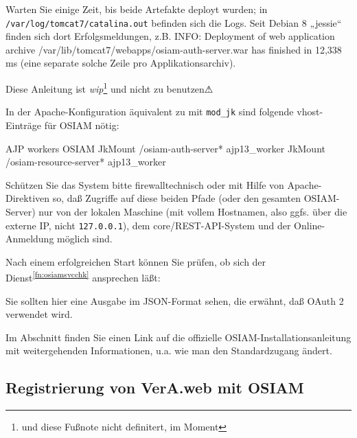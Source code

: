 Warten Sie einige Zeit, bis beide Artefakte deployt wurden; in
\texttt{/var/log/tomcat7/catalina.out} befinden sich die Logs.
Seit Debian 8 „jessie“ finden sich dort Erfolgsmeldungen, z.B.
{\ttfamily INFO: Deployment of web application archive
/var/lib/tomcat7/webapps/osiam-auth-server.war has finished
in 12,338 ms} (eine separate solche Zeile pro Applikationsarchiv).

Diese Anleitung ist \emph{wip}\Hair\footnote{\label{fn:jessie}und
diese Fußnote nicht definitert, im Moment} und nicht zu benutzen⚠

\begin{minipage}{\textwidth}
In der Apache-Konfiguration äquivalent zu 
mit \texttt{mod\_jk} sind folgende vhost-Einträge für OSIAM nötig:

\begin{lstdump}{AJP workers OSIAM}
JkMount /osiam-auth-server* ajp13_worker
JkMount /osiam-resource-server* ajp13_worker
\end{lstdump}
\end{minipage}

Schützen Sie das System bitte firewalltechnisch oder mit Hilfe von
Apache-Direktiven so, daß Zugriffe auf diese beiden Pfade (oder den
gesamten OSIAM-Server) nur von der lokalen Maschine (mit vollem
Hostnamen, also ggfs. über die externe IP, nicht \texttt{127.0.0.1}),
dem core/REST-API-System und der Online-Anmeldung möglich sind.

\begin{minipage}{\textwidth}
Nach einem erfolgreichen Start können Sie prüfen, ob sich der
Dienst\Hair\textsuperscript{\ref{fn:osiamsvcchk}} ansprechen läßt:


Sie sollten hier eine Ausgabe im JSON-Format sehen, die erwähnt,
daß OAuth 2 verwendet wird.
\end{minipage}

Im Abschnitt  finden Sie einen Link auf die
offizielle OSIAM-Installationsanleitung mit weitergehenden
Informationen, u.a. wie man den Standardzugang ändert.

\subsection{Registrierung von VerA.web mit OSIAM}\label{subsec:setup-osiam-register}


